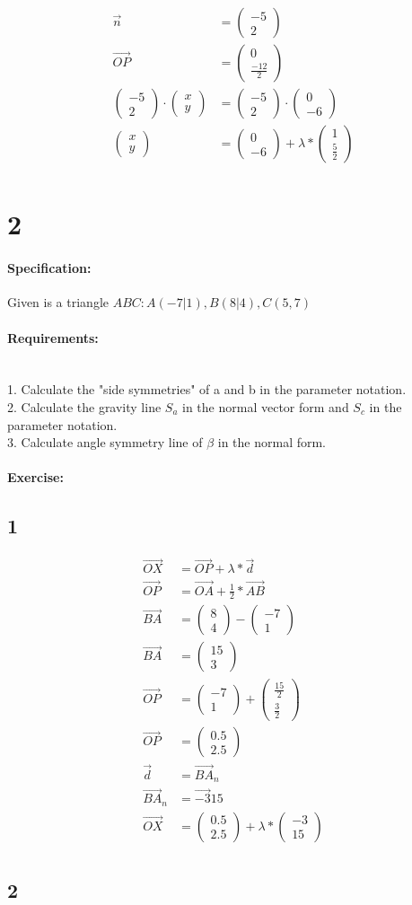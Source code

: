\documentclass{article}
\newcommand{\vectorTwo}[2]{\begin{pmatrix}
    #1 \\ 
    #2
\end{pmatrix}}
\begin{document}
\begin{align}
    \vec{n} &= \vectorTwo{-5}{2} \\
    \vec{OP} &= \vectorTwo{0}{\frac{-12}{2}} \\
    \vectorTwo{-5}{2} \cdot \vectorTwo{x}{y} &= \vectorTwo{-5}{2} \cdot \vectorTwo{0}{-6} \\[10pt]
    \vectorTwo{x}{y} &= \vectorTwo{0}{-6} + \lambda * \vectorTwo{1}{\frac{5}{2}} \\
\end{align}

\pagebreak

\section{2}

\paragraph{Specification:}
Given is a triangle $ABC: A(-7|1), B(8|4), C(5,7)$

\paragraph{Requirements:}\mbox{}\\
1. Calculate the "side symmetries" of a and b in the parameter notation. \mbox{}\\
2. Calculate the gravity line $S_a$ in the normal vector form and $S_c$ in the parameter notation. \mbox{}\\
3. Calculate angle symmetry line of $\beta$ in the normal form. \mbox{}\\

\paragraph{Exercise:}

\subsection{1}

\begin{align}
    \vec{OX} &= \vec{OP} + \lambda * \vec{d} \\
    \vec{OP} &= \vec{OA} + \frac{1}{2} * \vec{AB} \\
    \vec{BA} &= \vectorTwo{8}{4} - \vectorTwo{-7}{1} \\
    \vec{BA} &= \vectorTwo{15}{3} \\
    \vec{OP} &= \vectorTwo{-7}{1} + \vectorTwo{\frac{15}{2}}{\frac{3}{2}} \\
    \vec{OP} &= \vectorTwo{0.5}{2.5} \\
    \vec{d} &= \vec{BA}_n \\
    \vec{BA}_n &= \vec{-3}{15} \\
    \vec{OX} &= \vectorTwo{0.5}{2.5} + \lambda * \vectorTwo{-3}{15} \\
\end{align}

\subsection{2}
\end{document}
